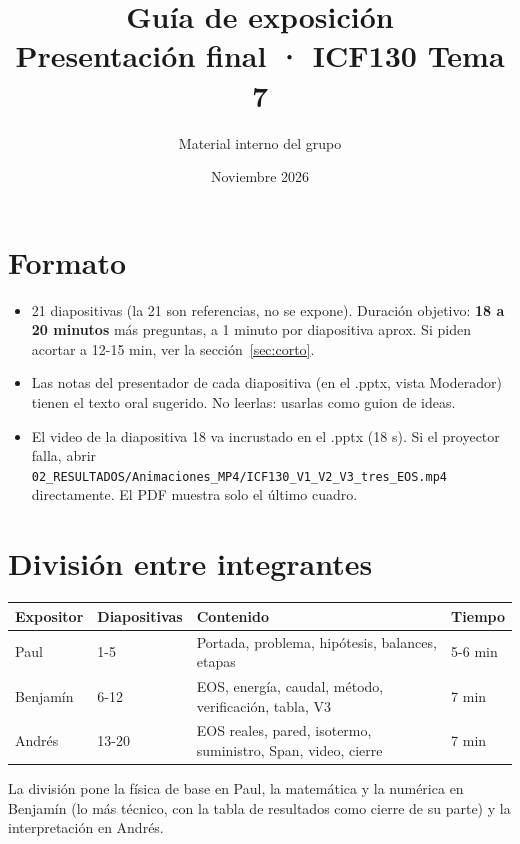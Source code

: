 \documentclass[11pt]{article}
\title{\color{tinta}\textbf{Guía de exposición}\\[4pt]\large Presentación final · ICF130 Tema 7}
\author{Material interno del grupo}
\date{Noviembre 2026}
\begin{document}
\maketitle
\section{Formato}
\begin{itemize}
\item 21 diapositivas (la 21 son referencias, no se expone). Duración objetivo: \textbf{18 a 20 minutos} más preguntas,
a 1 minuto por diapositiva aprox. Si piden acortar a 12-15 min, ver la sección~\ref{sec:corto}.
\item Las notas del presentador de cada diapositiva (en el .pptx, vista Moderador) tienen el texto oral sugerido.
No leerlas: usarlas como guion de ideas.
\item El video de la diapositiva 18 va incrustado en el .pptx (18 s). Si el proyector falla, abrir
\texttt{02\_RESULTADOS/Animaciones\_MP4/ICF130\_V1\_V2\_V3\_tres\_EOS.mp4} directamente. El PDF muestra solo el último cuadro.
\end{itemize}

\section{División entre integrantes}
\begin{center}\small
\begin{tabular}{llll}\toprule
Expositor & Diapositivas & Contenido & Tiempo\\\midrule
Paul & 1-5 & Portada, problema, hipótesis, balances, etapas & 5-6 min\\
Benjamín & 6-12 & EOS, energía, caudal, método, verificación, tabla, V3 & 7 min\\
Andrés & 13-20 & EOS reales, pared, isotermo, suministro, Span, video, cierre & 7 min\\\bottomrule
\end{tabular}\end{center}
La división pone la física de base en Paul, la matemática y la numérica en Benjamín (lo más técnico, con la
tabla de resultados como cierre de su parte) y la interpretación en Andrés.
\end{document}
